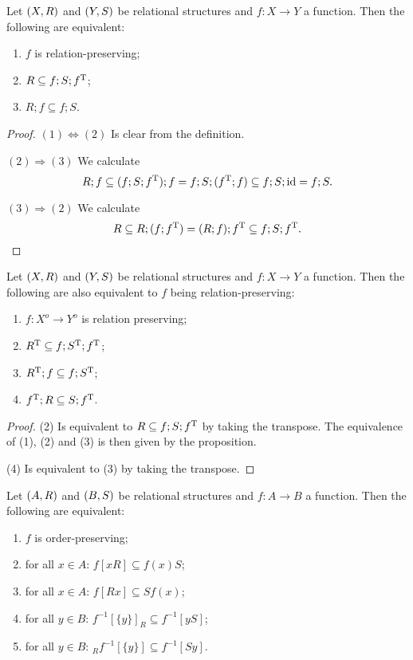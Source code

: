 \begin{proposition} \label{relationPreserving}
Let $\left( X, R \right)$ and $\left( Y, S \right)$ be relational structures and $f: X\to Y$ a function. Then the following are equivalent:
\begin{enumerate}
\item $f$ is relation-preserving;
\item $R \subseteq f;S;f^{\mathrm{T}}$;
\item $R;f \subseteq f;S$.
\end{enumerate}
\end{proposition}
\begin{proof}
$(1) \Leftrightarrow (2)$ Is clear from the definition.

$(2) \Rightarrow (3)$ We calculate
\[ R;f \subseteq (f;S;f^{\mathrm{T}});f = f;S;(f^{\mathrm{T}};f) \subseteq f;S;\operatorname{id} = f;S. \]

$(3) \Rightarrow (2)$ We calculate
\[ R \subseteq R;(f;f^{\mathrm{T}}) = (R;f);f^{\mathrm{T}} \subseteq f;S;f^{\mathrm{T}}. \]
\end{proof}
\begin{corollary}
Let $\left( X, R \right)$ and $\left( Y, S \right)$ be relational structures and $f: X\to Y$ a function. Then the following are also equivalent to $f$ being relation-preserving:
\begin{enumerate}
\item $f: X^o \to Y^o$ is relation preserving;
\item $R^{\mathrm{T}} \subseteq f;S^{\mathrm{T}};f^{\mathrm{T}}$;
\item $R^{\mathrm{T}};f \subseteq f;S^{\mathrm{T}}$;
\item $f^{\mathrm{T}};R \subseteq S;f^{\mathrm{T}}$.
\end{enumerate}
\end{corollary}
\begin{proof}
(2) Is equivalent to $R \subseteq f;S;f^{\mathrm{T}}$ by taking the transpose. The equivalence of (1), (2) and (3) is then given by the proposition.

(4) Is equivalent to (3) by taking the transpose.
\end{proof}
\begin{corollary} \label{functionImagesPreimagesAndPrincipalImages}
Let $\left( A,R \right)$ and $\left( B, S \right)$ be relational structures and $f: A\to B$ a function. Then the following are equivalent:
\begin{enumerate}
\item $f$ is order-preserving;
\item for all $x\in A$: $f[xR] \subseteq f(x)S$;
\item for all $x\in A$: $f[Rx] \subseteq Sf(x)$;
\item for all $y\in B$: $f^{-1}[\{y\}]_R \subseteq f^{-1}[yS]$;
\item for all $y\in B$: $_Rf^{-1}[\{y\}] \subseteq f^{-1}[Sy]$.
\end{enumerate}
\end{corollary}
